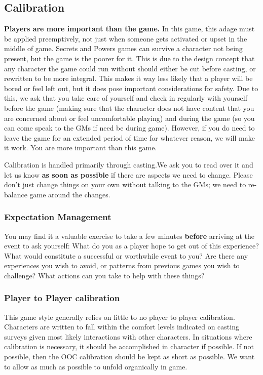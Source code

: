 \documentclass[sheet]{GL2020}
\begin{document}
\subsection{Calibration}
\textbf{Players are more important than the game.} In this game, this adage must be applied preemptively, not just when someone gets activated or upset in the middle of game. Secrets and Powers games can survive a character not being present, but the game is the poorer for it. This is due to the design concept that any character the game could run without should either be cut before casting, or rewritten to be more integral. This makes it way less likely that a player will be bored or feel left out, but it does pose important considerations for safety.  Due to this, we ask that you take care of yourself and check in regularly with yourself before the game (making sure that the character does not have content that you are concerned about or feel uncomfortable playing) and during the game (so you can come speak to the GMs if need be during game).  However, if you do need to leave the game for an extended period of time for whatever reason, we will make it work.  You are more important than this game.

Calibration is handled primarily through casting.We ask you to read over it and let us know \textbf{as soon as possible} if there are aspects we need to change. Please don't just change things on your own without talking to the GMs; we need to re-balance game around the changes.

\subsubsection{Expectation Management}
You may find it a valuable exercise to take a few minutes \textbf{before} arriving at the event to ask yourself: What do you as a player hope to get out of this experience? What would constitute a successful or worthwhile event to you? Are there any experiences you wish to avoid, or patterns from previous games you wish to challenge? What actions can you take to help with these things?

\subsubsection{Player to Player calibration}
This game style generally relies on little to no player to player calibration. Characters are written to fall within the comfort levels indicated on casting surveys given most likely interactions with other characters. In situations where calibration is necessary, it should be accomplished in character if possible. If not possible, then the OOC calibration should be kept as short as possible. We want to allow as much as possible to unfold organically in game.
\end{document}
